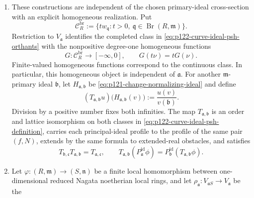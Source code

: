 \begin{theorem}
\begin{enumerate}
\[                              =\min\{\phi,0\}.
       \tag{\(\lozenge\)}\label{eq:p123-curve-ideal-psh-envelope}
      \]
      For finite \(\phi\), it belongs to
      \(\operatorname{CPSH}^{\mathrm{id}}_{\mathfrak a}(R)\), and the
      same function is the supremum of principal-ideal competitors in
      \eqref{eq:p123-principal-ideal-envelope}.
\item These constructions are independent of the chosen primary-ideal
      cross-section with an explicit homogeneous realization.  Put
      \[
       \mathcal C_R^{\mathrm{br}}
          :=\{t w_{\mathfrak q}:t>0,\
                  \mathfrak q\in\operatorname{Br}(R,\mathfrak m)\}.
      \]
      Restriction to \(V_{\mathfrak a}\) identifies the completed class
      in \eqref{eq:p122-curve-ideal-psh-orthants} with the nonpositive
      degree-one homogeneous functions
      \[
       G:\mathcal C_R^{\mathrm{br}}\longrightarrow[-\infty,0],
       \qquad G(t\nu)=tG(\nu).
       \tag{\(\circ\)}\label{eq:p122-curve-homogeneous-branch-psh}
      \]
      Finite-valued homogeneous functions correspond to the continuous
      class.  In particular, this homogeneous object is independent of
      \(\mathfrak a\).  For another
      \(\mathfrak m\)-primary ideal \(\mathfrak b\), let
      \(H_{\mathfrak a,\mathfrak b}\) be
      \eqref{eq:p121-change-normalizing-ideal} and define
      \[
       (T_{\mathfrak a,\mathfrak b}u)
          \bigl(H_{\mathfrak a,\mathfrak b}(v)\bigr)
          :=\frac{u(v)}{v(\mathfrak b)}.
       \tag{\(\diamondsuit\)}\label{eq:p122-curve-psh-normalization-transport}
      \]
      Division by a positive number fixes both infinities.  The map
      \(T_{\mathfrak a,\mathfrak b}\) is an order and lattice
      isomorphism on both classes in
      \eqref{eq:p122-curve-ideal-psh-definition}, carries each
      principal-ideal profile to the profile of the same pair \((f,N)\),
      extends by the same formula to extended-real obstacles, and satisfies
      \[
       T_{\mathfrak b,\mathfrak c}T_{\mathfrak a,\mathfrak b}
          =T_{\mathfrak a,\mathfrak c},
       \qquad
       T_{\mathfrak a,\mathfrak b}
          (P^{\mathrm{id}}_{\mathfrak a}\phi)
          =P^{\mathrm{id}}_{\mathfrak b}
             (T_{\mathfrak a,\mathfrak b}\phi).
       \tag{\(\clubsuit\)}\label{eq:p122-curve-psh-transport-cocycle}
      \]
\item Let
      \(\varphi:(R,\mathfrak m)\to(S,\mathfrak n)\) be a finite local
      homomorphism between one-dimensional reduced Nagata noetherian local
      rings, and let
      \(\rho_{\mathfrak a}:V_{\mathfrak aS}\to V_{\mathfrak a}\) be the

\end{enumerate}
\end{theorem}

